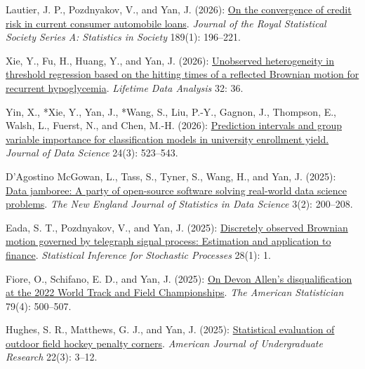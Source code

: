 \begin{RefereedJournalArticles}
\item *Lautier, J. P., Pozdnyakov, V., and Yan, J. (2026):
\href{https://doi.org/10.1093/jrsssa/qnae137}{On the convergence of
credit risk in current consumer automobile loans}. \emph{Journal of the
Royal Statistical Society Series A: Statistics in Society} 189(1):
196--221.

\item *Xie, Y., Fu, H., Huang, Y., and Yan, J. (2026):
\href{https://doi.org/10.1007/s10985-026-09717-x}{Unobserved
heterogeneity in threshold regression based on the hitting times of a
reflected Brownian motion for recurrent hypoglycemia}. \emph{Lifetime
Data Analysis} 32: 36.

\item Yin, X., *Xie, Y., Yan, J., *Wang, S., Liu,
P.-Y., Gagnon, J., Thompson, E., Walsh, L., Fuerst, N., and Chen, M.-H.
(2026): \href{https://doi.org/10.6339/26-JDS1241}{Prediction intervals
and group variable importance for classification models in university
enrollment yield.} \emph{Journal of Data Science} 24(3): 523--543.

\item D'Agostino McGowan, L., Tass, S., Tyner, S., Wang, H., and Yan, J.
(2025): \href{https://doi.org/10.51387/25-NEJSDS79}{Data jamboree: A
party of open-source software solving real-world data science problems}.
\emph{The New England Journal of Statistics in Data Science} 3(2):
200--208.

\item *Eada, S. T., Pozdnyakov, V., and Yan, J. (2025):
\href{https://doi.org/10.1007/s11203-024-09319-0}{Discretely observed
Brownian motion governed by telegraph signal process: Estimation and
application to finance}. \emph{Statistical Inference for Stochastic
Processes} 28(1): 1.

\item *Fiore, O., Schifano, E. D., and Yan, J. (2025):
\href{https://doi.org/10.1080/00031305.2025.2515869}{On Devon Allen's
disqualification at the 2022 World Track and Field Championships}.
\emph{The American Statistician} 79(4): 500--507.

\item *Hughes, S. R., Matthews, G. J., and Yan, J. (2025):
\href{https://doi.org/10.33697/ajur.2025.145}{Statistical evaluation of
outdoor field hockey penalty corners}. \emph{American Journal of
Undergraduate Research} 22(3): 3--12.


\end{RefereedJournalArticles}

